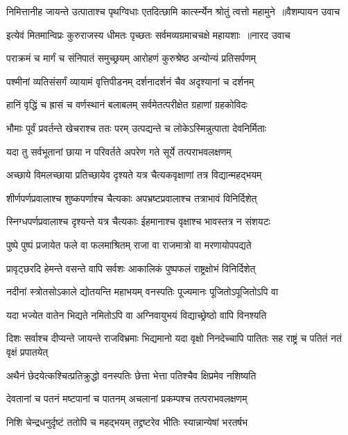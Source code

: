 \threelineshloka
{निमित्तानीह जायन्ते उत्पाताश्च पृथग्विधाः}
{एतदित्छामि कार्त्स्न्येन श्रोतुं त्वत्तो महामुने ॥वैशम्पायन उवाच}
{}


\twolineshloka
{इत्येवं मितमान्विप्रः कुरुराजस्य धीमतः}
{पृच्छतः सर्वमव्यग्रमाचचक्षे महायशाः ॥नारद उवाच}


\twolineshloka
{पराक्रमं च मार्गं च संनिपातं समुच्छ्रयम्}
{आरोहणं कुरुश्रेष्ठ अन्योन्यं प्रतिसर्पणम्}


\twolineshloka
{पश्मीनां व्यतिसंसर्गं व्यायामं वृत्तिपीडनम्}
{दर्शनादर्शनं चैव अदृश्यानां च दर्शनम्}


\twolineshloka
{हानिं वृद्धिं च ह्रासं च वर्णस्थानं बलाबलम्}
{सर्वमेतत्परीक्षेत ग्रहाणां ग्रहकोविदः}


\twolineshloka
{भौमाः पूर्वं प्रवर्तन्ते खेचराश्च ततः परम्}
{उत्पद्यन्ते च लोकेऽस्मिन्नुत्पाता देवनिर्मिताः}


\twolineshloka
{यदा तु सर्वभूतानां छाया न परिवर्तते}
{अपरेण गते सूर्ये तत्पराभवलक्षणम्}


\twolineshloka
{अच्छाये विमलच्छाया प्रतिच्छायेव दृश्यते}
{यत्र चैत्यकवृक्षाणां तत्र विद्यान्महद्भयम्}


\twolineshloka
{शीर्णपर्णप्रवालाश्च शुष्कपर्णाश्च चैत्यकाः}
{अपभ्रष्टप्रवालाश्च तत्राभावं विनिर्दिशेत्}


\twolineshloka
{स्निग्धपर्णप्रवालाश्च दृश्यन्ते यत्र चैत्यकाः}
{ईहमानाश्च वृक्षाश्च भावस्तत्र न संशयटः}


\twolineshloka
{पुष्पे पुष्पं प्रजायेत फले वा फलमाश्रितम्}
{राजा वा राजमात्रो वा मरणायोपपद्यते}


\twolineshloka
{प्रावृट्छरदि हेमन्ते वसन्ते वापि सर्वशः}
{आकालिकं पुष्पफलं राष्ट्रक्षोभं विनिर्दिशेत्}


\twolineshloka
{नदीनां स्त्रोतसोऽकाले द्योतयन्ति महाभयम्}
{वनस्पतिः पूज्यमानः पूजितोऽपूजितोऽपि वा}


\twolineshloka
{यदा भज्येत वातेन भिद्यते नमितोऽपि वा}
{अग्निवायुभयं विद्याच्छ्रेष्ठो वापि विनश्यति}


\threelineshloka
{दिशः सर्वाश्च दीप्यन्ते जायन्ते राजविभ्रमाः}
{भिद्यमानो यदा वृक्षो निनदेच्चापि पातितः}
{सह राष्ट्रं च पतितं नतं वृक्षं प्रपातयेत्}


\twolineshloka
{अथैनं छेदयेत्कश्चित्प्रतिक्रुद्धो वनस्पतिः}
{छेत्ता भेत्ता पतिश्चैव क्षिप्रमेव नशिष्यति}


\twolineshloka
{देवतानां च पतनं मष्टपानां च पातनम्}
{अचलानां प्रकम्पश्च तत्पराभवलक्षणम्}


\twolineshloka
{निशि चेन्द्रधनुर्दृष्टं ततोपि च महद्भयम्}
{तद्द्रष्टरेव भीतिः स्यान्नान्येषां भरतर्षभ}


